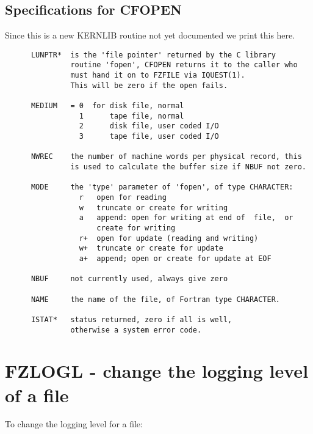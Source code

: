 \subsection*{Specifications for CFOPEN}

Since this is a new KERNLIB routine not yet documented we print this
here.

\begin{verbatim}
      LUNPTR*  is the 'file pointer' returned by the C library
               routine 'fopen', CFOPEN returns it to the caller who
               must hand it on to FZFILE via IQUEST(1).
               This will be zero if the open fails.

      MEDIUM   = 0  for disk file, normal
                 1      tape file, normal
                 2      disk file, user coded I/O
                 3      tape file, user coded I/O

      NWREC    the number of machine words per physical record, this
               is used to calculate the buffer size if NBUF not zero.

      MODE     the 'type' parameter of 'fopen', of type CHARACTER:
                 r   open for reading
                 w   truncate or create for writing
                 a   append: open for writing at end of  file,  or
                     create for writing
                 r+  open for update (reading and writing)
                 w+  truncate or create for update
                 a+  append; open or create for update at EOF

      NBUF     not currently used, always give zero

      NAME     the name of the file, of Fortran type CHARACTER.

      ISTAT*   status returned, zero if all is well,
               otherwise a system error code.
\end{verbatim}

\section{FZLOGL - change the logging level of a file}

To change the logging level for a file:

